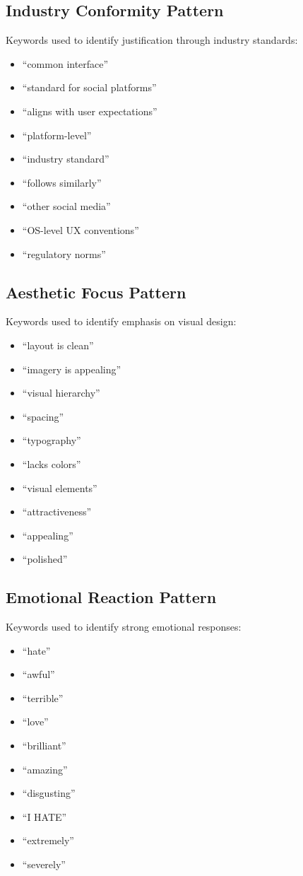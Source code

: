 \subsection{Industry Conformity Pattern}
Keywords used to identify justification through industry standards:
\begin{itemize}
\item ``common interface''
\item ``standard for social platforms''
\item ``aligns with user expectations''
\item ``platform-level''
\item ``industry standard''
\item ``follows similarly''
\item ``other social media''
\item ``OS-level UX conventions''
\item ``regulatory norms''
\end{itemize}

\subsection{Aesthetic Focus Pattern}
Keywords used to identify emphasis on visual design:
\begin{itemize}
\item ``layout is clean''
\item ``imagery is appealing''
\item ``visual hierarchy''
\item ``spacing''
\item ``typography''
\item ``lacks colors''
\item ``visual elements''
\item ``attractiveness''
\item ``appealing''
\item ``polished''
\end{itemize}

\subsection{Emotional Reaction Pattern}
Keywords used to identify strong emotional responses:
\begin{itemize}
\item ``hate''
\item ``awful''
\item ``terrible''
\item ``love''
\item ``brilliant''
\item ``amazing''
\item ``disgusting''
\item ``I HATE''
\item ``extremely''
\item ``severely''
\end{itemize}

